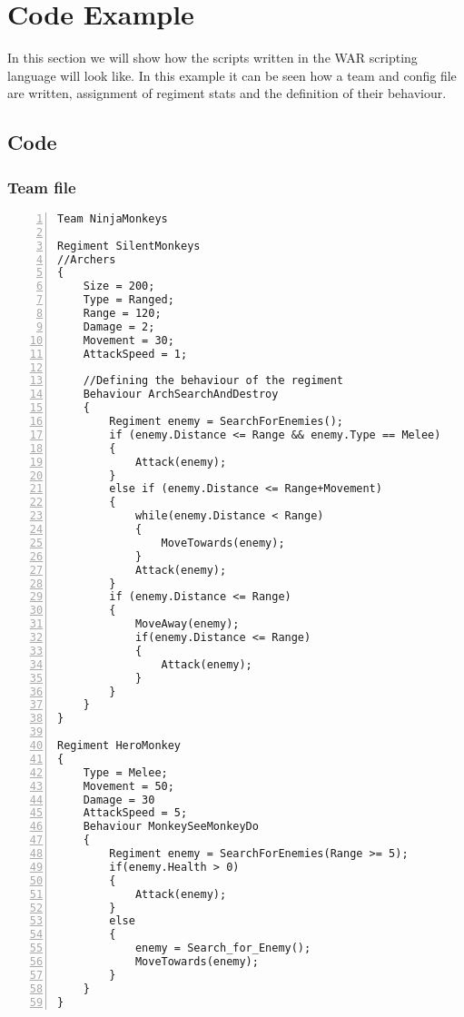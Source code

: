 \section{Code Example}
	In this section we will show how the scripts written in the WAR scripting language will look like.
	In this example it can be seen how a team and config file are written, assignment of regiment stats and the definition of their behaviour.
	\subsection{Code}
		\subsubsection{Team file}
					\begin{lstlisting}[basicstyle=\small\sffamily,
					keywords={break,case,const,continue,default,else,enum,
					for,if,return,switch,while,do,long,void,int,float,double,
					char,struct,typedef,include,size\_t},
					keywordstyle={\color{blue}},
					comment={[l]{//}}, morecomment={[s]{/*}{*/}}, commentstyle=\itshape,
					columns={[l]flexible}, numbers=left, numberstyle=\tiny,
					frameround=fftt, frame=shadowbox, captionpos=b,
					caption={Team file},
					label=LST:code31]
Team NinjaMonkeys

Regiment SilentMonkeys
//Archers
{
	Size = 200;
	Type = Ranged;
	Range = 120;
	Damage = 2;
	Movement = 30;
	AttackSpeed = 1;
	
	//Defining the behaviour of the regiment
	Behaviour ArchSearchAndDestroy
	{
		Regiment enemy = SearchForEnemies();
		if (enemy.Distance <= Range && enemy.Type == Melee)
		{
			Attack(enemy);
		}
		else if (enemy.Distance <= Range+Movement)
		{
			while(enemy.Distance < Range)
			{
				MoveTowards(enemy);
			}
			Attack(enemy);
		}
		if (enemy.Distance <= Range)
		{
			MoveAway(enemy);
			if(enemy.Distance <= Range)
			{
				Attack(enemy);
			}
		}
	}
}

Regiment HeroMonkey
{
	Type = Melee;
	Movement = 50;
	Damage = 30
	AttackSpeed = 5;
	Behaviour MonkeySeeMonkeyDo
	{
		Regiment enemy = SearchForEnemies(Range >= 5);
		if(enemy.Health > 0)
		{
			Attack(enemy);
		}
		else
		{
			enemy = Search_for_Enemy();
			MoveTowards(enemy);
		}
	}
}
					\end{lstlisting}
